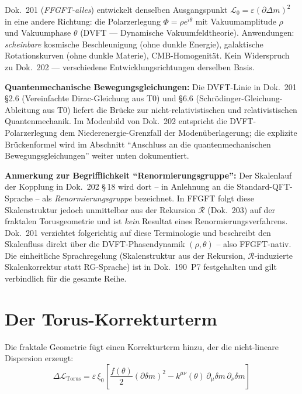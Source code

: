 \begin{tcolorbox}[colback=gray!5, colframe=gray!50!black, boxrule=0.5pt,
  arc=2pt, left=3mm, right=3mm, fontupper=\small,
  title={Verwandtes Dokument: Dok.~201 (DVFT-Adaptation)}]
Dok.~201 (\textit{FFGFT-alles}) entwickelt denselben Ausgangspunkt
$\mathcal{L}_0 = \varepsilon(\partial\Delta m)^2$ in eine andere
Richtung: die Polarzerlegung $\Phi = \rho e^{i\theta}$ mit
Vakuumamplitude $\rho$ und Vakuumphase $\theta$ (DVFT ---
Dynamische Vakuumfeldtheorie). Anwendungen: \textit{scheinbare} kosmische Beschleunigung
(ohne dunkle Energie), galaktische Rotationskurven
(ohne dunkle Materie), CMB-Homogenität. Kein Widerspruch zu Dok.~202 ---
verschiedene Entwicklungsrichtungen derselben Basis.

\medskip

\textbf{Quantenmechanische Bewegungsgleichungen:} Die DVFT-Linie in
Dok.~201 \S 2.6 (Vereinfachte Dirac-Gleichung aus T0) und \S 6.6
(Schrödinger-Gleichung-Ableitung aus T0) liefert die Brücke zur
nicht-relativistischen und relativistischen Quantenmechanik. Im
Modenbild von Dok.~202 entspricht die DVFT-Polarzerlegung dem
Niederenergie-Grenzfall der Modenüberlagerung; die explizite
Brückenformel wird im Abschnitt
\enquote{Anschluss an die quantenmechanischen Bewegungsgleichungen}
weiter unten dokumentiert.

\medskip

\textbf{Anmerkung zur Begrifflichkeit \enquote{Renormierungsgruppe}:}
Der Skalenlauf der Kopplung in Dok.~202 \S\,18 wird dort -- in
Anlehnung an die Standard-QFT-Sprache -- als
\emph{Renormierungsgruppe} bezeichnet. In FFGFT folgt diese
Skalenstruktur jedoch unmittelbar aus der Rekursion $\mathcal{R}$
(Dok.~203) auf der fraktalen Torusgeometrie und ist
\emph{kein} Resultat eines Renormierungsverfahrens. Dok.~201 verzichtet
folgerichtig auf diese Terminologie und beschreibt den Skalenfluss
direkt über die DVFT-Phasendynamik
$(\rho, \theta)$ -- also FFGFT-nativ. Die einheitliche Sprachregelung
(Skalenstruktur aus der Rekursion, $\mathcal{R}$-induzierte
Skalenkorrektur statt RG-Sprache) ist in Dok.~190~P7
festgehalten und gilt verbindlich für die gesamte Reihe.
\end{tcolorbox}

\section{Der Torus-Korrekturterm}

Die fraktale Geometrie fügt einen Korrekturterm hinzu, der die
nicht-lineare Dispersion erzeugt:
\begin{equation}
  \Delta\mathcal{L}_{\text{Torus}}
  = \varepsilon\,\xi_0\!\left[
    \frac{f(\theta)}{2}(\partial\delta m)^2
    - k^{\mu\nu}(\theta)\,\partial_\mu\delta m\,\partial_\nu\delta m
    \right]
\end{equation}

